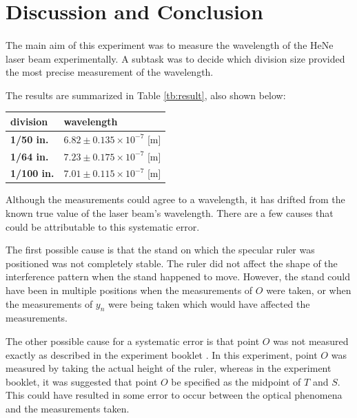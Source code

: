 \documentclass{article}
\begin{document}
\section{Discussion and Conclusion}
\paragraph{}
The main aim of this experiment was to measure the wavelength of the HeNe laser beam experimentally. A subtask was to decide which division size provided the most precise measurement of the wavelength.

The results are summarized in Table \ref{tb:result}, also shown below:

\begin{table}[H]
\begin{tabular}{|l|l|}
\hline
\textbf{division}  & \textbf{wavelength}                 \\ \hline
\textbf{1/50 in.}  & $6.82 \pm 0.135 \times 10^{-7}$ [m] \\ \hline
\textbf{1/64 in.}  & $7.23 \pm 0.175 \times 10^{-7}$ [m] \\ \hline
\textbf{1/100 in.} & $7.01 \pm 0.115 \times 10^{-7}$ [m] \\ \hline
\end{tabular}
\end{table}

Although the measurements could agree to a wavelength, it has drifted from the known true value of the laser beam's wavelength. There are a few causes that could be attributable to this systematic error.

The first possible cause is that the stand on which the specular ruler was positioned was not completely stable. The ruler did not affect the shape of the interference pattern when the stand happened to move. However, the stand could have been in multiple positions when the measurements of $O$ were taken, or when the measurements of $y_n$ were being taken which would have affected the measurements.

The other possible cause for a systematic error is that point $O$ was not measured exactly as described in the experiment booklet \autocite{UPCSE2018}. In this experiment, point $O$ was measured by taking the actual height of the ruler, whereas in the experiment booklet, it was suggested that point $O$ be specified as the midpoint of $T$ and $S$. This could have resulted in some error to occur between the optical phenomena and the measurements taken.
\end{document}
